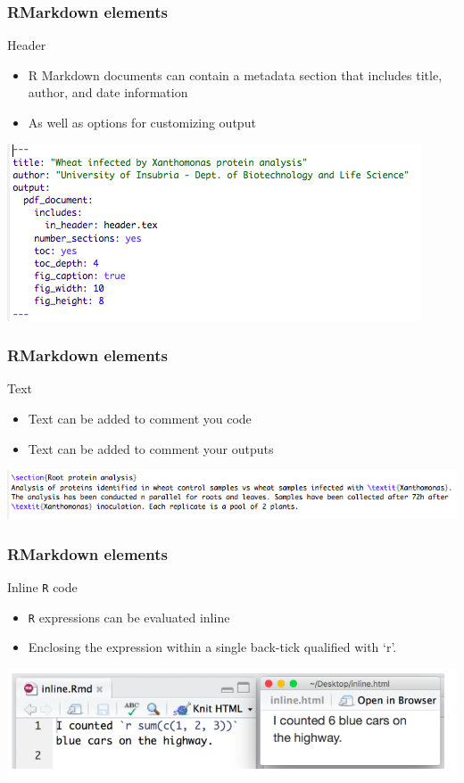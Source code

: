 \documentclass{beamer}
\begin{document}
\begin{frame}
    \frametitle{RMarkdown elements}
    \centering \Large Header
    \normalsize
    	\begin{itemize}
		\item R Markdown documents can contain a metadata section that includes title, author, and date information 
		\item As well as options for customizing output
	\end{itemize}
	\begin{center}	\includegraphics[scale=0.6]{figures/RMarkdown_hearder.png} \end{center}
    
\end{frame}

\begin{frame}
    \frametitle{RMarkdown elements}
    \centering \Large Text
    \normalsize
    	\begin{itemize}
		\item Text can be added to comment you code
		\item Text can be added to comment your outputs
	\end{itemize}
	\begin{center}	\includegraphics[scale=0.6]{figures/RMarkdown_text.png} \end{center}
\end{frame}

\begin{frame}
    \frametitle{RMarkdown elements}
	\centering \Large Inline \texttt{R} code
	\normalsize
	\begin{itemize}
		\item \texttt{R} expressions can be evaluated inline 
		\item Enclosing the expression within a single back-tick qualified with ‘r’.
	\end{itemize}
	\begin{center}	\includegraphics[scale=0.4]{figures/RMarkdown_inline.png} \end{center}
\end{frame}
\end{document}
